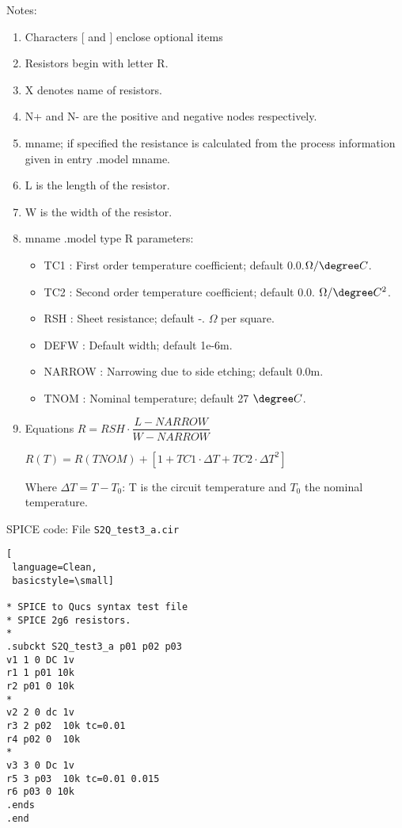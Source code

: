 \begin{flushleft}
Notes: 
  \begin{enumerate}
   \item Characters [ and ] enclose optional items 
 \item Resistors begin with letter R.
 \item X denotes name of resistors.
 \item N+ and N- are the positive and negative nodes respectively.
 \item mname; if specified the resistance is calculated from the process information given in entry .model mname.
 \item L is the length of the resistor.
 \item W is the width of the resistor.
 \item mname .model type R  parameters:
 \begin{itemize}
\item TC1  : First order temperature coefficient; default 0.0.$\Omega / \degree C$.
\item TC2  : Second order temperature coefficient; default 0.0. $\Omega / \degree C^{2}$.
\item RSH  : Sheet resistance; default -. $\Omega$ per square.
\item DEFW : Default width; default 1e-6m.
\item NARROW : Narrowing due to side etching; default 0.0m.
\item TNOM : Nominal temperature; default 27 $\degree C$.
\end{itemize}

 
  \item Equations
   $R = RSH \cdot \dfrac{L-NARROW}{W-NARROW}$


   $R(T) = R(TNOM)+\left[ 1+TC1 \cdot \Delta T+TC2 \cdot \Delta T^{2} \right] $

Where $\Delta T = T-T_{0}$: T is the circuit temperature and $T_{0}$ the nominal temperature. 
  \end{enumerate}

\end{flushleft}


\begin{flushleft}

SPICE code: File \verb|S2Q_test3_a.cir|

\end{flushleft}

\begin{lstlisting}[
 language=Clean, 
 basicstyle=\small]

* SPICE to Qucs syntax test file 
* SPICE 2g6 resistors.
*
.subckt S2Q_test3_a p01 p02 p03
v1 1 0 DC 1v
r1 1 p01 10k
r2 p01 0 10k
*
v2 2 0 dc 1v
r3 2 p02  10k tc=0.01
r4 p02 0  10k
*
v3 3 0 Dc 1v
r5 3 p03  10k tc=0.01 0.015
r6 p03 0 10k
.ends
.end


\end{lstlisting}

